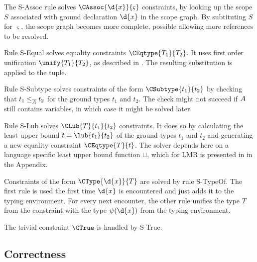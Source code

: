 The {\sc S-Assoc} rule solves $\CAssoc{\d{x}}{\varsigma}$ constraints,
by looking up the scope $S$ associated with ground declaration $\d{x}$ in the
scope graph. By subtituting $S$ for $\varsigma$, the scope graph
becomes more complete, possible allowing more references to be
resolved.

Rule {\sc
  S-Equal} solves equality constraints $\CEqtype{T_1}{T_2}$. It uses first order unification $\unify{T_1}{T_2}$, as described in
\cite{0092409}. The resulting substitution is applied to the tuple.

Rule {\sc S-Subtype} solves constraints of the form
$\CSubtype{t_1}{t_2}$ by checking that $t_1 \leq_{\overline{A}} t_2$ for the
ground types $t_1$ and $t_2$. The check might not succeed if $A$
still contains variables, in which case it might be solved later.

Rule {\sc S-Lub} solves $\CLub{T}{t_1}{t_2}$ constraints. It does so
by calculating the least upper bound $t = \lub{t_1}{t_2}$ of the
ground types $t_1$ and $t_2$ and generating a new equality constraint
$\CEqtype{T}{t}$. The solver depends here on a language specific
least upper bound function $\sqcup$, which for LMR is presented in
 in the Appendix.

Constraints of the form $\CType{\d{x}}{T}$ are solved by rule {\sc
  S-TypeOf}. The first rule is used
the first time $\d{x}$ is encountered and just adds it to the typing
environment. For every next encounter, the other rule unifies the type
$T$ from the constraint with the type $\psi(\d{x})$ from the typing
environment. 

The trivial constraint $\CTrue$ is handled by {\sc S-True}.


\subsection{Correctness}

